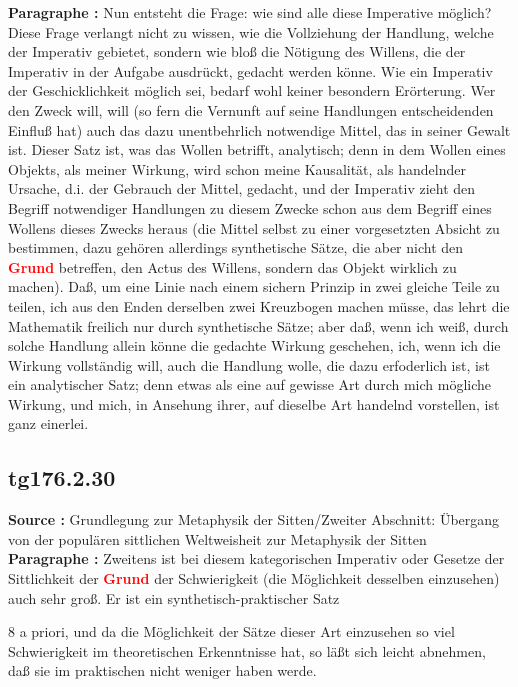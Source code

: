 \documentclass[a4paper,12pt,twoside]{book}
\newcommand{\match}[1]{\textcolor{red}{\textbf{#1}}}
\begin{document}
	\noindent\textbf{Paragraphe : }Nun entsteht die Frage: wie sind alle diese Imperative möglich? Diese Frage verlangt nicht zu wissen, wie die Vollziehung der Handlung, welche der Imperativ gebietet, sondern wie bloß die Nötigung des Willens, die der Imperativ in der Aufgabe ausdrückt, gedacht werden könne. Wie ein Imperativ der Geschicklichkeit möglich sei, bedarf wohl keiner besondern Erörterung. Wer den Zweck will, will (so fern die Vernunft auf seine Handlungen entscheidenden Einfluß hat) auch das dazu unentbehrlich notwendige Mittel, das in seiner Gewalt ist. Dieser Satz ist, was das Wollen betrifft, analytisch; denn in dem Wollen eines Objekts, als meiner Wirkung, wird schon meine Kausalität, als handelnder Ursache, d.i. der Gebrauch der Mittel, gedacht, und der Imperativ zieht den Begriff notwendiger Handlungen zu diesem Zwecke schon aus dem Begriff eines Wollens dieses Zwecks heraus (die Mittel selbst zu einer vorgesetzten Absicht  zu bestimmen, dazu gehören allerdings synthetische Sätze, die aber nicht den \match{Grund} betreffen, den Actus des Willens, sondern das Objekt wirklich zu machen). Daß, um eine Linie nach einem sichern Prinzip in zwei gleiche Teile zu teilen, ich aus den Enden derselben zwei Kreuzbogen machen müsse, das lehrt die Mathematik freilich nur durch synthetische Sätze; aber daß, wenn ich weiß, durch solche Handlung allein könne die gedachte Wirkung geschehen, ich, wenn ich die Wirkung vollständig will, auch die Handlung wolle, die dazu erfoderlich ist, ist ein analytischer Satz; denn etwas als eine auf gewisse Art durch mich mögliche Wirkung, und mich, in Ansehung ihrer, auf dieselbe Art handelnd vorstellen, ist ganz einerlei. 
	
	\subsection*{tg176.2.30} 
	\textbf{Source : }Grundlegung zur Metaphysik der Sitten/Zweiter Abschnitt: Übergang von der populären sittlichen Weltweisheit zur Metaphysik der Sitten\\  
	
	\noindent\textbf{Paragraphe : }Zweitens ist bei diesem kategorischen Imperativ oder Gesetze der Sittlichkeit der \match{Grund} der Schwierigkeit (die Möglichkeit desselben einzusehen) auch sehr groß. Er ist ein synthetisch-praktischer Satz
	
	
	8
	a priori, und da die Möglichkeit der Sätze dieser Art einzusehen so viel Schwierigkeit im theoretischen Erkenntnisse hat, so läßt sich leicht abnehmen, daß sie im praktischen nicht weniger haben werde. 
	
\end{document}
